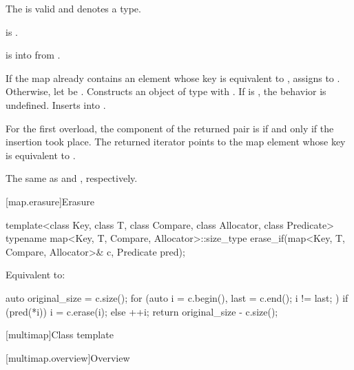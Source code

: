 \begin{itemdescr}
\pnum
\constraints
The  
is valid and denotes a type.

\pnum
\mandates
{} is .

\pnum
\expects
{} is  into  from
.

\pnum
\effects
If the map already contains an element 
whose key is equivalent to ,
assigns  to .
Otherwise, let  be .
Constructs an object  of type 
with .
If  is ,
the behavior is undefined.
Inserts  into .

\pnum
\returns
For the first overload,
the  component of the returned pair is 
if and only if the insertion took place.
The returned iterator points to the map element
whose key is equivalent to .

\pnum
\complexity
The same as  and , respectively.
\end{itemdescr}

[map.erasure]{Erasure}

%
\begin{itemdecl}
template<class Key, class T, class Compare, class Allocator, class Predicate>
  typename map<Key, T, Compare, Allocator>::size_type
    erase_if(map<Key, T, Compare, Allocator>& c, Predicate pred);
\end{itemdecl}

\begin{itemdescr}
\pnum
\effects
Equivalent to:
\begin{codeblock}
auto original_size = c.size();
for (auto i = c.begin(), last = c.end(); i != last; ) {
  if (pred(*i)) {
    i = c.erase(i);
  } else {
    ++i;
  }
}
return original_size - c.size();
\end{codeblock}
\end{itemdescr}

[multimap]{Class template }

[multimap.overview]{Overview}

